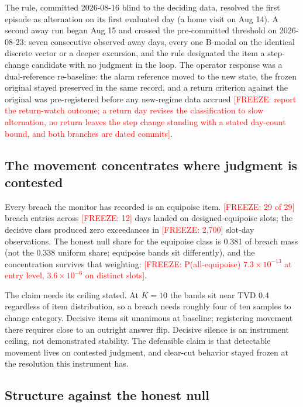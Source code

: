 \documentclass[conference]{IEEEtran}
\newcommand{\freeze}[1]{\textcolor{red}{[FREEZE: #1]}}
\begin{document}
The rule, committed 2026-08-16 blind to the deciding data, resolved
the first episode as alternation on its first evaluated day (a home
visit on Aug 14). A second away run began Aug 15 and crossed the
pre-committed threshold on 2026-08-23: seven consecutive observed
away days, every one B-modal on the identical discrete vector or a
deeper excursion, and the rule designated the item a step-change
candidate with no judgment in the loop. The operator response was a
dual-reference re-baseline: the alarm reference moved to the new
state, the frozen original stayed preserved in the same record, and
a return criterion against the original was pre-registered before
any new-regime data accrued \freeze{report the return-watch
outcome; a return day revises the classification to slow
alternation, no return leaves the step change standing with a
stated day-count bound, and both branches are dated commits}.

\subsection{The movement concentrates where judgment is contested}
\label{sec:concentration}

Every breach the monitor has recorded is an equipoise item.
\freeze{29 of 29} breach entries across \freeze{12} days landed on
designed-equipoise slots; the decisive class produced zero
exceedances in \freeze{2,700} slot-day observations. The honest
null share for the equipoise class is 0.381 of breach mass (not the
0.338 uniform share; equipoise bands sit differently), and the
concentration survives that weighting: \freeze{P(all-equipoise)
$7.3\times10^{-13}$ at entry level, $3.6\times10^{-6}$ on distinct
slots}.

The claim needs its ceiling stated. At $K=10$ the bands sit near
TVD 0.4 regardless of item distribution, so a breach needs roughly
four of ten samples to change category. Decisive items sit
unanimous at baseline; registering movement there requires close to
an outright answer flip. Decisive silence is an instrument ceiling,
not demonstrated stability. The defensible claim is that detectable
movement lives on contested judgment, and clear-cut behavior stayed
frozen at the resolution this instrument has.

\subsection{Structure against the honest null}
\label{sec:structure}
\end{document}
